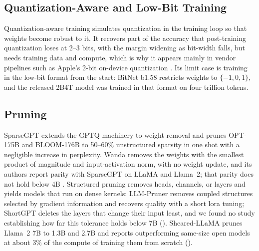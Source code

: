 \subsection{Quantization-Aware and Low-Bit Training}

Quantization-aware training simulates quantization in the training loop so that weights become robust to it. It recovers part of the accuracy that post-training quantization loses at 2--3 bits, with the margin widening as bit-width falls, but needs training data and compute, which is why it appears mainly in vendor pipelines such as Apple's 2-bit on-device quantization \citep{gunter2025afm}. Its limit case is training in the low-bit format from the start: BitNet b1.58 \citep{ma2024bitnet158} restricts weights to $\{-1,0,1\}$, and the released 2B4T model was trained in that format on four trillion tokens.

\subsection{Pruning}

SparseGPT \citep{frantar2023sparsegpt} extends the GPTQ machinery to weight removal and prunes OPT-175B and BLOOM-176B to 50--60\% unstructured sparsity in one shot with a negligible increase in perplexity. Wanda \citep{sun2024wanda} removes the weights with the smallest product of magnitude and input-activation norm, with no weight update, and its authors report parity with SparseGPT on LLaMA and Llama~2; that parity does not hold below 4B \citep{kurz2025pruning_vs_quant}. Structured pruning removes heads, channels, or layers and yields models that run on dense kernels: LLM-Pruner \citep{ma2023llmpruner} removes coupled structures selected by gradient information and recovers quality with a short \gls{lora} tuning; ShortGPT \citep{men2024shortgpt} deletes the layers that change their input least, and we found no study establishing how far this tolerance holds below 7B (\evD). Sheared-LLaMA \citep{xia2024sheared} prunes Llama~2 7B to 1.3B and 2.7B and reports outperforming same-size open models at about 3\% of the compute of training them from scratch (\evC).
